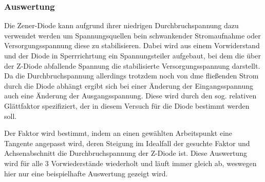\documentclass[12pt,twoside,a4paper]{scrartcl}
\begin{document}
			\subsubsection{Auswertung}
				Die Zener-Diode kann aufgrund ihrer niedrigen Durchbruchspannung dazu verwendet werden um Spannungsquellen bein schwankender Stromaufnahme oder Versorgungsspannung diese zu stabilisieren. Dabei wird aus einem Vorwiderstand und der Diode in Sperrrichrtung ein Spannungsteiler aufgebaut, bei dem die über der Z-Diode abfallende Spannung die stabilisierte Versorgungsspannung darstellt. Da die Durchbruchspannung allerdings trotzdem noch von dme fließenden Strom durch die Diode abhängt ergibt sich bei einer Änderung der Eingangsspannung auch eine Änderung der Ausgangsspannung. Diese wird durch den sog. relativen Glättfaktor spezifiziert, der in diesem Versuch für die Diode bestimmt werden soll.

				Der Faktor wird bestimmt, indem an einen gewählten Arbeitspunkt eine Tangente angepasst wird, deren Steigung im Idealfall der gesuchte Faktor und Achsenabschnitt die Durchbruchspannung der Z-Diode ist.
				Diese Auswertung wird für alle 3 Vorwiederstände wiederholt und läuft immer gleich ab, weswegen hier nur eine beispielhafte Auswertung gezeigt wird.
\end{document}

